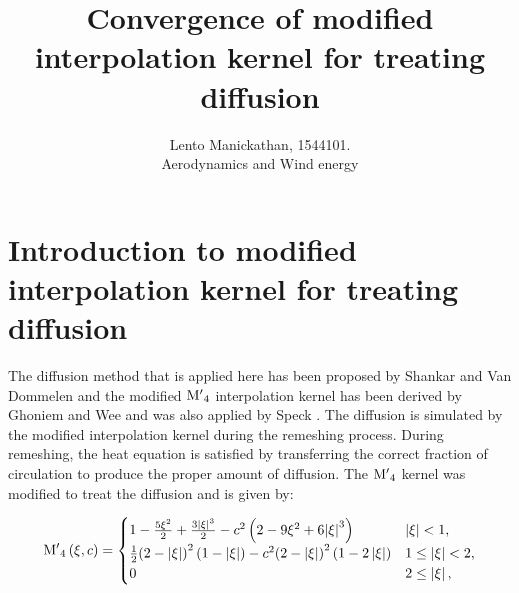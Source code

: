 


\title{Convergence of modified interpolation kernel for treating diffusion}
\author{Lento Manickathan, 1544101.\\Aerodynamics and Wind energy}

%



\section{Introduction to modified interpolation kernel for treating diffusion}
The diffusion method that is applied here has been proposed by Shankar and Van Dommelen \cite{Shankar1996} and the modified ${{{\rm{M'}}}_4}$ interpolation kernel has been derived by Ghoniem and Wee \cite{Wee2006} and was also applied by Speck \cite{Speck2011}. The diffusion is simulated by the modified interpolation kernel during the remeshing process. During remeshing, the heat equation is satisfied by transferring the correct fraction of circulation to produce the proper amount of diffusion. The ${{{\rm{M'}}}_4}$ kernel was modified to treat the diffusion and is given by: 

\begin{equation}
{{{\rm{M'}}}_4}\left( {\xi ,c} \right) =
  \begin{cases}
   {1 - \frac{{5{\xi ^2}}}{2} + \frac{{3{{\left| \xi  \right|}^3}}}{2} - {c^2}\left( {2 - 9{\xi ^2} + 6{{\left| \xi  \right|}^3}} \right)} & {\left| \xi \right|} < 1, \\
   \frac{1}{2}{\left( {2 - \left| \xi  \right|} \right)^2}\left( {1 - \left| \xi  \right|} \right) - {c^2}{\left( {2 - \left| \xi  \right|} \right)^2}\left( {1 - 2\left| \xi  \right|} \right) & 1 \le {\left| \xi \right|} < 2,\\
   0 & 2 \le \left| \xi \right|,
  \end{cases}
\label{eq:modInterpKernel}
\end{equation}

